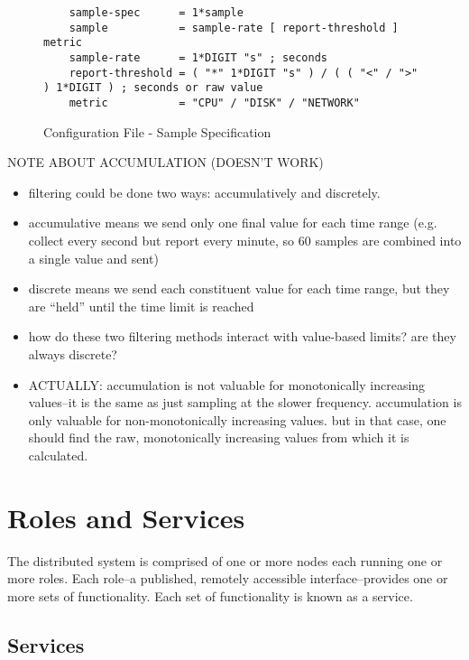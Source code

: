 \begin{figure}[ht]
    \begin{lstlisting}
    sample-spec      = 1*sample
    sample           = sample-rate [ report-threshold ] metric
    sample-rate      = 1*DIGIT "s" ; seconds
    report-threshold = ( "*" 1*DIGIT "s" ) / ( ( "<" / ">" ) 1*DIGIT ) ; seconds or raw value
    metric           = "CPU" / "DISK" / "NETWORK"
    \end{lstlisting}
    \caption{Configuration File - Sample Specification}
    \label{fig:config_file_sample}
\end{figure}

NOTE ABOUT ACCUMULATION (DOESN'T WORK)

\begin{itemize}
\item filtering could be done two ways: accumulatively and discretely.
\item accumulative means we send only one final value for each time range (e.g. collect every second but report every
      minute, so 60 samples are combined into a single value and sent)
\item discrete means we send each constituent value for each time range, but they are ``held'' until the time limit is
      reached
\item how do these two filtering methods interact with value-based limits? are they always discrete?
\item ACTUALLY: accumulation is not valuable for monotonically increasing values--it is the same as just sampling at the
      slower frequency. accumulation is only valuable for non-monotonically increasing values. but in that case, one
      should find the raw, monotonically increasing values from which it is calculated.
\end{itemize}

\section{\dcamp Roles and Services}
\label{roles_and_services}

The \dcamp distributed system is comprised of one or more nodes each running one or more roles. Each role--a published,
remotely accessible interface--provides one or more sets of functionality. Each set of functionality is known as a
service.

\subsection{Services}

